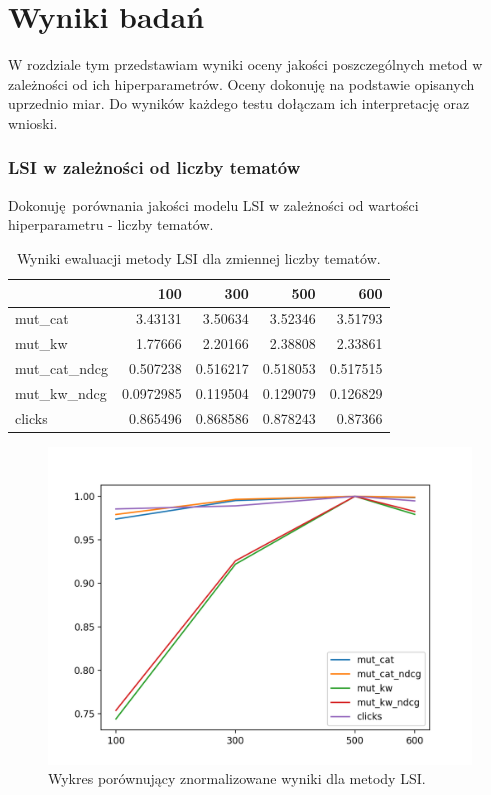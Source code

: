 \documentclass[pl]{minipw} %
\begin{document}
\chapter{Wyniki badań}
W rozdziale tym przedstawiam wyniki oceny jakości poszczególnych metod w zależności od ich hiperparametrów. Oceny dokonuję na podstawie opisanych uprzednio miar. Do wyników każdego testu dołączam ich interpretację oraz wnioski.

\subsection{LSI w zależności od liczby tematów}

Dokonuję porównania jakości modelu LSI w zależności od wartości hiperparametru - liczby tematów.

\begin{table}[H]
	\centering
	\begin{tabular}{lrrrr}
		\hline
		&       100 &      300 &      500 &      600 \\
		\hline
		mut\_cat      & 3.43131   & 3.50634  & 3.52346  & 3.51793  \\
		mut\_kw       & 1.77666   & 2.20166  & 2.38808  & 2.33861  \\
		mut\_cat\_ndcg & 0.507238  & 0.516217 & 0.518053 & 0.517515 \\
		mut\_kw\_ndcg  & 0.0972985 & 0.119504 & 0.129079 & 0.126829 \\
		clicks       & 0.865496  & 0.868586 & 0.878243 & 0.87366  \\
		\hline
	\end{tabular}
	\caption{Wyniki ewaluacji metody LSI dla zmiennej liczby tematów.}
\end{table}

\begin{figure}[H]
	\centering
	\includegraphics[width=1\textwidth]{img/results/lsi.png}
	\caption{Wykres porównujący znormalizowane wyniki dla metody LSI.}
\end{figure}
\end{document}
